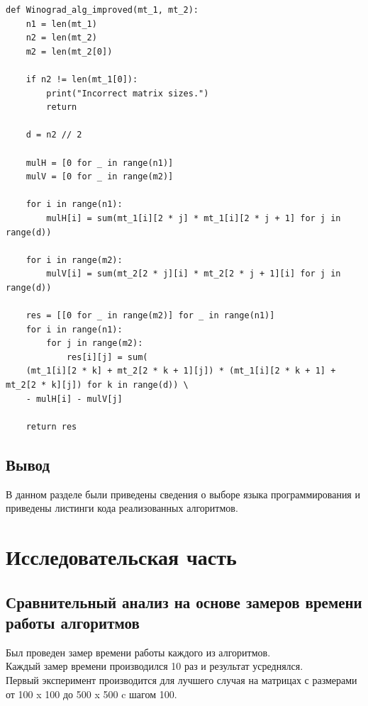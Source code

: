 \documentclass[12pt]{report}
\begin{document}
\begin{lstlisting}[label=some-code,caption=Оптимизированный алгоритм Винограда]
def Winograd_alg_improved(mt_1, mt_2):
	n1 = len(mt_1)
	n2 = len(mt_2)
	m2 = len(mt_2[0])
	
	if n2 != len(mt_1[0]):
		print("Incorrect matrix sizes.")
		return
	
	d = n2 // 2
	
	mulH = [0 for _ in range(n1)]
	mulV = [0 for _ in range(m2)]
	
	for i in range(n1):
		mulH[i] = sum(mt_1[i][2 * j] * mt_1[i][2 * j + 1] for j in range(d))
	
	for i in range(m2):
		mulV[i] = sum(mt_2[2 * j][i] * mt_2[2 * j + 1][i] for j in range(d))
	
	res = [[0 for _ in range(m2)] for _ in range(n1)]
	for i in range(n1):
		for j in range(m2):
			res[i][j] = sum(
	(mt_1[i][2 * k] + mt_2[2 * k + 1][j]) * (mt_1[i][2 * k + 1] + mt_2[2 * k][j]) for k in range(d)) \
	- mulH[i] - mulV[j]
	
	return res
\end{lstlisting}

\section{Вывод}
В данном разделе были приведены сведения о выборе языка программирования 
и приведены листинги кода реализованных алгоритмов.



\chapter{Исследовательская часть}

\section{Сравнительный анализ на основе замеров времени работы алгоритмов}

Был проведен замер времени работы каждого из алгоритмов.\\
Каждый замер времени производился 10 раз и результат усреднялся.\\
Первый эксперимент производится для лучшего случая на матрицах с размерами от 100 x 100 до 500 x 500 c шагом 100. \\


\end{document}
